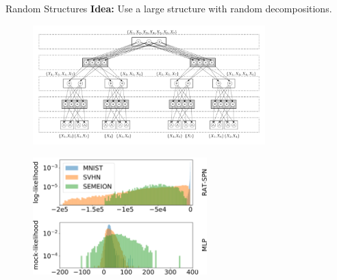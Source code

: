 \begin{frame}{Random Structures}{}
    \textbf{Idea:} Use a large structure with random decompositions.

    \begin{figure}
    \centering
    \includegraphics[width=0.8\textwidth]{example_RAT-SPN-eps-converted-to}
    \end{figure}

    \pause

    \begin{figure}
    \centering
    \includegraphics[width=0.6\textwidth]{transfer-testing-lambda-0-2-crop}
\end{figure}

\end{frame}

%

